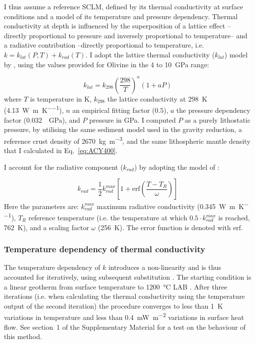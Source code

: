 I thus assume a reference SCLM, defined by its thermal conductivity at surface conditions and a model of its temperature and pressure dependency.
Thermal conductivity at depth is influenced by the superposition of a lattice effect --directly proportional to pressure and inversely proportional to temperature-- and a radiative contribution --directly proportional to temperature, i.e. $k = k_{lat}(P,T) + k_{rad}(T)$.
I adopt the lattice thermal conductivity ($k_{lat}$) model by \textcite{Xu2004}, using the values provided for Olivine in the 4 to 10~GPa range:

\begin{equation}
	\label{kLat}
	k_{lat} = k_{298} \left( \frac{298}{T} \right)^n (1+ a P)
\end{equation}
where $T$ is temperature in \si{\kelvin}, $k_{298}$ the lattice conductivity at \SI{298}{\kelvin} (\SI{4.13}{\watt \per \metre \per \kelvin}), $n$ an empirical fitting factor ($0.5$), $a$ the pressure dependency factor (\SI{0.032}{\per \giga \pascal}), and $P$ pressure in \si{\giga \pascal}.
I computed $P$ as a purely lithostatic pressure, by utilising the same sediment model used in the gravity reduction, a reference crust density of 2670~\si{\kilo \gram \per \cubic \metre}, and the same lithospheric mantle density that I calculated in Eq.~\ref{eq:ACY400}.

I account for the radiative component ($k_{rad}$) by adopting the model of \textcite{Hasterok2011cont}:

\begin{equation}
	\label{kRad}
	k_{rad} = \frac{1}{2} k_{rad}^{max}  \left[ 1 + \mathrm{erf} \left( \frac{T-T_R}{\omega} \right) \right]
\end{equation}
Here the parameters are: $k_{rad}^{max}$ maximum radiative conductivity (\SI{0.345}{\watt \per \metre \per \kelvin}), $T_R$ reference temperature (i.e. the temperature at which $0.5 \cdot k_{rad}^{max}$ is reached, \SI{762}{\kelvin}), and a scaling factor $\omega$ (\SI{256}{\kelvin}).
The error function is denoted with $\mathrm{erf}$.

\subsubsection{Temperature dependency of thermal conductivity}
\label{sss:Appl:ThermCondTdep}
The temperature dependency of $k$ introduces a non-linearity and is thus accounted for iteratively, using subsequent substitution \parencite[or ``Picard's method'', e.g. ][]{Hauck1999}.
The starting condition is a linear geotherm from surface temperature to \SI{1200}{\celsius} LAB \parencite{fischer2010lab}.
After three iterations (i.e. when calculating the thermal conductivity using the temperature output of the second iteration) the procedure converges to less than \SI{1}{\kelvin} variations in temperature and less than {0.4}~\si{\milli \watt \per \square \metre} variations in surface heat flow.
See section~1 of the Supplementary Material for a test on the behaviour of this method.

